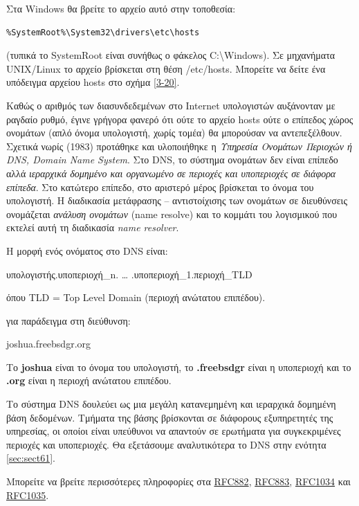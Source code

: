 Στα Windows θα βρείτε το αρχείο αυτό στην τοποθεσία:

\begin{verbatim}
%SystemRoot%\System32\drivers\etc\hosts
\end{verbatim}

(τυπικά το SystemRoot είναι συνήθως ο φάκελος C:\textbackslash{}Windows). Σε μηχανήματα UNIX/Linux το αρχείο βρίσκεται στη θέση /etc/hosts. Μπορείτε να δείτε ένα υπόδειγμα αρχείου hosts στο σχήμα \ref{3-20}.

Καθώς ο αριθμός των διασυνδεδεμένων στο Internet υπολογιστών αυξάνονταν με ραγδαίο ρυθμό, έγινε γρήγορα φανερό ότι ούτε το αρχείο hosts ούτε ο επίπεδος χώρος ονομάτων (απλό όνομα υπολογιστή, χωρίς τομέα) θα μπορούσαν να αντεπεξέλθουν. Σχετικά νωρίς (1983) προτάθηκε και υλοποιήθηκε η \emph{Υπηρεσία Ονομάτων Περιοχών ή DNS, Domain Name System}. Στο DNS, το σύστημα ονομάτων δεν είναι επίπεδο αλλά \emph{ιεραρχικά δομημένο και οργανωμένο σε περιοχές και υποπεριοχές σε διάφορα επίπεδα}. Στο κατώτερο επίπεδο, στο αριστερό μέρος βρίσκεται το όνομα του υπολογιστή. Η διαδικασία μετάφρασης -- αντιστοίχισης των ονομάτων σε διευθύνσεις ονομάζεται \emph{ανάλυση ονομάτων} (name resolve) και το κομμάτι του λογισμικού που εκτελεί αυτή τη διαδικασία \emph{name resolver}.

Η μορφή ενός ονόματος στο DNS είναι:

\begin{centering}
υπολογιστής.υποπεριοχή\_n. \ldots{} .υποπεριοχή\_1.περιοχή\_TLD
\end{centering}

όπου TLD = Top Level Domain (περιοχή ανώτατου επιπέδου).

για παράδειγμα στη διεύθυνση:

\begin{centering}
joshua.freebsdgr.org
\end{centering}

Το \textbf{joshua} είναι το όνομα του υπολογιστή, το \textbf{.freebsdgr} είναι η υποπεριοχή και το \textbf{.org} είναι η περιοχή ανώτατου επιπέδου.

Το σύστημα DNS δουλεύει ως μια μεγάλη κατανεμημένη και ιεραρχικά δομημένη βάση δεδομένων. Τμήματα της βάσης βρίσκονται σε διάφορους εξυπηρετητές της υπηρεσίας, οι οποίοι είναι υπεύθυνοι να απαντούν σε ερωτήματα για συγκεκριμένες περιοχές και υποπεριοχές. Θα εξετάσουμε αναλυτικότερα το DNS στην ενότητα \ref{sec:sect61}. 

Μπορείτε να βρείτε περισσότερες πληροφορίες στα \href{https://www.ietf.org/rfc/rfc882.txt}{RFC882}, \href{https://www.ietf.org/rfc/rfc883.txt}{RFC883}, \href{https://www.ietf.org/rfc/rfc1034.txt}{RFC1034} και \href{https://www.ietf.org/rfc/rfc1035.txt}{RFC1035}.